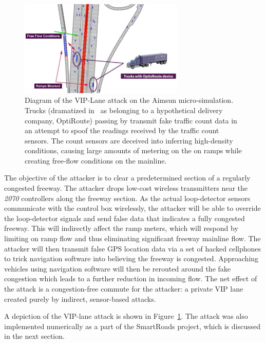 \begin{figure}[t]
    \centering
    \includegraphics[width=0.7\textwidth]{diagrams/trucks}
    \caption[Diagram of the VIP-Lane attack on the Aimsun micro-simulation.]{Diagram of the VIP-Lane attack on the Aimsun micro-simulation. Trucks (dramatized in~\cite{smartroadswebsite} as belonging to a hypothetical delivery company, OptiRoute) passing by transmit fake traffic count data in an attempt to spoof the readings received by the traffic count sensors. The count sensors are deceived into inferring high-density conditions, causing large amounts of metering on the on ramps while creating free-flow conditions on the mainline.}
    \label{fig:smart-roads-diagram}
\end{figure}


            The objective of the attacker is to clear a predetermined section of a regularly congested freeway. The attacker drops low-cost wireless transmitters near the \emph{2070} controllers along the freeway section. As the actual loop-detector sensors communicate with the control box wirelessly, the attacker will be able to override the loop-detector signals and send false data that indicates a fully congested freeway. This will indirectly affect the ramp meters, which will respond by limiting on ramp flow and thus eliminating significant freeway mainline flow. The attacker will then transmit false GPS location data via a set of hacked cellphones to trick navigation software into believing the freeway is congested. Approaching vehicles using navigation software will then be rerouted around the fake congestion which leads to a further reduction in incoming flow. The net effect of the attack is a congestion-free commute for the attacker: a private VIP lane created purely by indirect, sensor-based attacks.

A depiction of the VIP-lane attack is shown in Figure~\ref{fig:smart-roads-diagram}. The attack was also implemented numerically as a part of the SmartRoads project, which is discussed in the next section.

